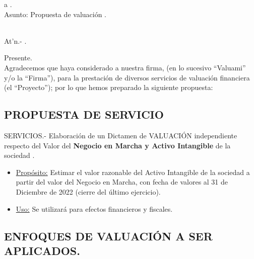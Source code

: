 \documentclass[5pt,letter]{article}
\begin{document}
\begin{flushright}
\lugarCotizacion{} a \fechaCotizacion.\\
\textcolor{principal}{Asunto:} Propuesta de valuación \empresaSolicitante.
\end{flushright}

\textcolor{principal}{\empresaSolicitante}\\

At'n.- \textcolor{principal}{\personaSolicitante.}\\
\indent \textcolor{principal}{\caracterSolicitante}

Presente.\\

Agradecemos que haya considerado a nuestra firma, (en lo sucesivo ``Valuami''\textregistered{} y/o la ``Firma''), para la prestación de diversos servicios de valuación financiera (el “Proyecto”); por lo que hemos preparado la siguiente propuesta:

\begin{center}
\section{PROPUESTA DE SERVICIO}
\end{center}

\textcolor{principal}{SERVICIOS.-} Elaboración de un Dictamen de VALUACIÓN independiente respecto del Valor del \textbf{Negocio en Marcha y  Activo Intangible}  de la sociedad \textcolor{principal}{\empresaSolicitante}.\\

 \begin{itemize}
 \item \underline{Propósito:} Estimar el valor razonable del Activo Intangible de la sociedad \empresaSolicitante{} a partir del valor del Negocio en Marcha, con fecha de valores al 31 de Diciembre de 2022 (cierre del último ejercicio).
 
\item \underline{Uso:} Se utilizará para efectos financieros y fiscales.
 
 \end{itemize}
 
 \begin{center}
 \section{ENFOQUES DE VALUACIÓN A SER APLICADOS.}
 \end{center}
 
\end{document}
